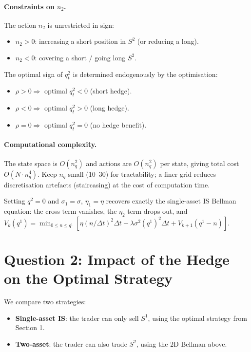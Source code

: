\documentclass[12pt, a4paper]{article}
\begin{document}
\paragraph{Constraints on $n_2$.}
The action $n_2$ is unrestricted in sign:
\begin{itemize}[leftmargin=1.5em]
  \item $n_2 > 0$: increasing a short position in $S^2$ (or reducing a long).
  \item $n_2 < 0$: covering a short / going long $S^2$.
\end{itemize}
The optimal sign of $q^2_t$ is determined endogenously by the optimisation:
\begin{itemize}[leftmargin=1.5em]
  \item $\rho > 0 \Rightarrow$ optimal $q^2_t < 0$ (short hedge).
  \item $\rho < 0 \Rightarrow$ optimal $q^2_t > 0$ (long hedge).
  \item $\rho = 0 \Rightarrow$ optimal $q^2_t = 0$ (no hedge benefit).
\end{itemize}

\paragraph{Computational complexity.}
The state space is $O(n_q^2)$ and actions are $O(n_q^2)$ per state,
giving total cost $O(N \cdot n_q^4)$. Keep $n_q$ small (10--30) for
tractability; a finer grid reduces discretisation artefacts (staircasing)
at the cost of computation time.

\begin{notebox}
  Setting $q^2 = 0$ and $\sigma_1=\sigma$, $\eta_1=\eta$ recovers exactly
  the single-asset IS Bellman equation: the cross term vanishes, the $\eta_2$
  term drops out, and $V_k(q^1) = \min_{0\le n\le q^1}[\eta(n/\Delta t)^2\Delta t
  + \lambda\sigma^2(q^1)^2\Delta t + V_{k+1}(q^1-n)]$.
\end{notebox}

\section{Question 2: Impact of the Hedge on the Optimal Strategy}
\label{sec:impact}

We compare two strategies:
\begin{itemize}[leftmargin=1.5em]
  \item \textbf{Single-asset IS}: the trader can only sell $S^1$,
        using the optimal strategy from Section 1.
  \item \textbf{Two-asset}: the trader can also trade $S^2$,
        using the 2D Bellman above.
\end{itemize}
\end{document}
